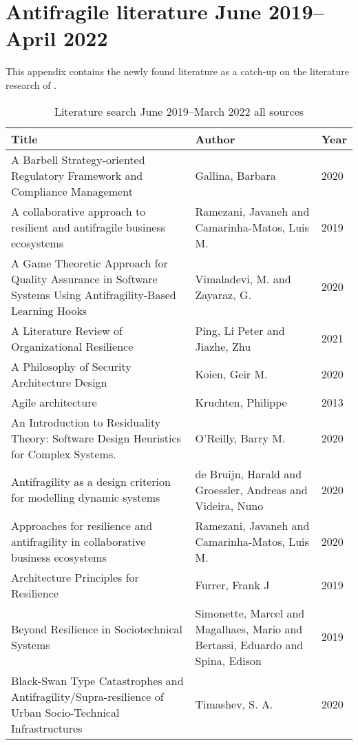 \chapter{Antifragile literature June 2019--April 2022}
\label{app:literaturecatchup}
This appendix contains the newly found literature as a catch-up on the literature research of \textcite{Botjes2020}.

\begin{longtable}{p{}p{}p{}}
	\toprule%
	\textbf{Title} & \textbf{Author} & \textbf{Year} \\
	\midrule%
	\endhead%
	\hline
	\endfoot%
	\caption[Literature search June 2019--March 2022 all sources]{Literature search June 2019--March 2022 all sources}
	\label{tab:literatureafter2020all}
	\endlastfoot%
		A Barbell Strategy-oriented Regulatory Framework and Compliance Management & Gallina, Barbara & 2020 \\
		A collaborative approach to resilient and antifragile business ecosystems & Ramezani, Javaneh and Camarinha-Matos, Luis M. & 2019 \\
		A Game Theoretic Approach for Quality Assurance in Software Systems Using Antifragility-Based Learning Hooks & Vimaladevi, M. and Zayaraz, G. & 2020 \\
		A Literature Review of Organizational Resilience & Ping, Li Peter and Jiazhe, Zhu & 2021 \\
		A Philosophy of Security Architecture Design & Koien, Geir M. & 2020 \\
		Agile architecture & Kruchten, Philippe & 2013 \\
		An Introduction to Residuality Theory: Software Design Heuristics for Complex Systems. & O'Reilly, Barry M. & 2020 \\
		Antifragility as a design criterion for modelling dynamic systems & de Bruijn, Harald and Groessler, Andreas and Videira, Nuno & 2020 \\
		Approaches for resilience and antifragility in collaborative business ecosystems & Ramezani, Javaneh and Camarinha-Matos, Luis M. & 2020 \\
		Architecture Principles for Resilience & Furrer, Frank J & 2019 \\
		Beyond Resilience in Sociotechnical Systems & Simonette, Marcel and Magalhaes, Mario and Bertassi, Eduardo and Spina, Edison & 2019 \\
		Black-Swan Type Catastrophes and Antifragility/Supra-resilience of Urban Socio-Technical Infrastructures & Timashev, S. A. & 2020 \\

\end{longtable}
